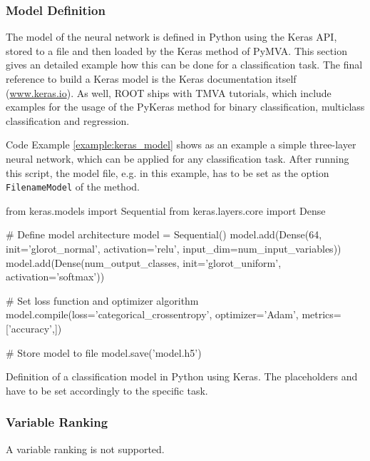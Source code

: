 \subsubsection{Model Definition}
\label{sec:keras_model_definition}

The model of the neural network is defined in Python using the Keras API, stored to a file and then loaded by the Keras method of PyMVA. This section gives an detailed example how this can be done for a classification task. The final reference to build a Keras model is the Keras documentation itself (\url{www.keras.io}). As well, ROOT ships with TMVA tutorials, which include examples for the usage of the PyKeras method for binary classification, multiclass classification and regression.

Code Example \ref{example:keras_model} shows as an example a simple three-layer neural network, which can be applied for any classification task. After running this script, the model file, e.g.  in this example, has to be set as the option \texttt{FilenameModel} of the method.

\begin{codeexample}
\begin{tmvacode}
from keras.models import Sequential
from keras.layers.core import Dense

# Define model architecture
model = Sequential()
model.add(Dense(64, init='glorot_normal', activation='relu',
        input_dim=num_input_variables))
model.add(Dense(num_output_classes, init='glorot_uniform',
        activation='softmax'))

# Set loss function and optimizer algorithm
model.compile(loss='categorical_crossentropy', optimizer='Adam',
        metrics=['accuracy',])

# Store model to file
model.save('model.h5')
\end{tmvacode}
\caption[.]{\codeexampleCaptionSize Definition of a classification model in Python using Keras. The placeholders  and  have to be set accordingly to the specific task.}
\label{example:keras_model}
\end{codeexample}

\subsubsection{Variable Ranking}
A variable ranking is not supported.
